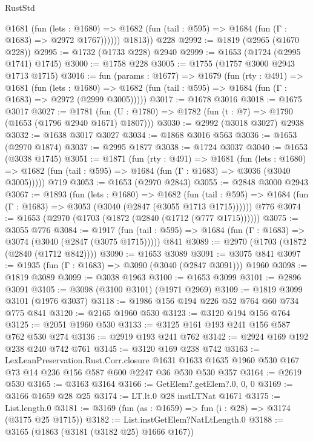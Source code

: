 \begin{lexlean}{RustStd}
\begin{coremodule}
{\begin{coremodule}
{{{{{{{{{{{{{{{{            @1681
              (fun (lets : @1680) =>
              @1682 (fun (tail : @595) => @1684 (fun (Γ : @1683) => @2972 @1767))))))
        @1813))
    @228
@2992 := @1819 (@2965 (@1670 @228))
@2995 := @1732 (@1733 @228) @2940
@2999 := @1653 (@1724 (@2995 @1741) @1745)
@3000 := @1758 @228
@3005 := @1755 (@1757 @3000 @2943 @1713 @1715)
@3016 := fun (params : @1677) =>
  @1679
    (fun (rty : @491) =>
    @1681
      (fun (lets : @1680) =>
      @1682 (fun (tail : @595) => @1684 (fun (Γ : @1683) => @2972 (@2999 @3005)))))
@3017 := @1678 @3016
@3018 := @1675 @3017
@3027 := @1781 (fun (U : @1780) => @1782 (fun (t : @7) => @1790 (@1653 (@1796 @2940 @1671) @1807)))
@3030 := @2992 (@3018 @3027) @2938
@3032 := @1638 @3017 @3027
@3034 := @1868 @3016 @563
@3036 := @1653 (@2970 @1874)
@3037 := @2995 @1877
@3038 := @1724 @3037
@3040 := @1653 (@3038 @1745)
@3051 := @1871
    (fun (rty : @491) =>
    @1681
      (fun (lets : @1680) =>
      @1682 (fun (tail : @595) => @1684 (fun (Γ : @1683) => @3036 (@3040 @3005)))))
    @719
@3053 := @1653 (@2970 @2843)
@3055 := @2848 @3000 @2943
@3067 := @1893
    (fun (lets : @1680) =>
    @1682
      (fun (tail : @595) => @1684 (fun (Γ : @1683) => @3053 (@3040 (@2847 (@3055 @1713 @1715))))))
    @776
@3074 := @1653 (@2970 (@1703 (@1872 (@2840 (@1712 (@777 @1715))))))
@3075 := @3055 @776
@3084 := @1917
    (fun (tail : @595) => @1684 (fun (Γ : @1683) => @3074 (@3040 (@2847 (@3075 @1715)))))
    @841
@3089 := @2970 (@1703 (@1872 (@2840 (@1712 @842))))
@3090 := @1653 @3089
@3091 := @3075 @841
@3097 := @1935 (fun (Γ : @1683) => @3090 (@3040 (@2847 @3091))) @1960
@3098 := @1819 @3089
@3099 := @3038 @1963
@3100 := @1653 @3099
@3101 := @2896 @3091
@3105 := @3098 (@3100 @3101) (@1971 @2969)
@3109 := @1819 @3099 @3101 (@1976 @3037)
@3118 := @1986 @156 @194 @226 @52 @764 @60 @734 @775 @841
@3120 := @2165 @1960 @530
@3123 := @3120 @194 @156 @764
@3125 := @2051 @1960 @530
@3133 := @3125 @161 @193 @241 @156 @587 @762 @530 @274
@3136 := @2919 @193 @241 @762
@3142 := @2924 @169 @192 @238 @240 @742 @761
@3145 := @3120 @169 @238 @742
@3163 := LexLeanPreservation.Rust.Corr.closure
    @1631
    @1633
    @1635
    @1960
    @530
    @167
    @73
    @14
    @236
    @156
    @587
    @600
    @2247
    @36
    @530
    @530
    @357
@3164 := @2619 @530
@3165 := @3163 @3164
@3166 := GetElem?.getElem?.{0, 0, 0}
@3169 := @3166 @1659 @28 @25
@3174 := LT.lt.{0} @28 instLTNat @1671
@3175 := List.length.{0}
@3181 := @3169 (fun (as : @1659) => fun (i : @28) => @3174 (@3175 @25 @1715))
@3182 := List.instGetElem?NatLtLength.{0}
@3188 := @3165 (@1863 (@3181 (@3182 @25) @1666 @167))
}}}}}}}}}}}}}}}}
\end{coremodule}}
\end{coremodule}
\end{lexlean}
